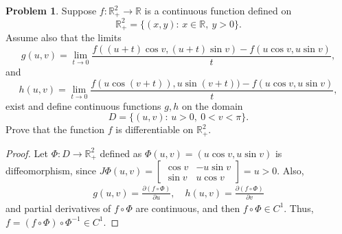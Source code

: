 \documentclass[11pt]{article}
\theoremstyle{definition}
\newtheorem{problem}{Problem}
\theoremstyle{definition}
\begin{document}
\begin{problem}
Suppose $f:\mathbb{R}^2_+\to\mathbb{R}$ is a continuous function defined on
$$\mathbb{R}^2_+=\{(x,y):\, x\in\mathbb{R},\ y>0\}.$$
Assume also that the limits
$$g(u,v)=\lim_{t\to 0}\frac{f((u+t)\cos v,(u+t)\sin v)-f(u\cos v,u\sin v)}{t},$$
and
$$h(u,v)=\lim_{t\to 0}\frac{f(u\cos (v+t)),u\sin (v+t))-f(u\cos v,u\sin v)}{t},$$
exist and define continuous functions $g,h$ on the domain
$$D=\{(u,v):\, u>0,\ 0<v<\pi\}.$$
Prove that the function $f$ is differentiable on $\mathbb{R}^2_+$.
\end{problem}
\begin{proof}
Let $\Phi: D \to \mathbb{R}^2_+$ defined as $\Phi(u,v) = (u \cos v, u \sin v)$ is diffeomorphism, since $J\Phi(u,v) = \begin{bmatrix} \cos v & -u \sin v \\ \sin v & u \cos v \end{bmatrix} = u > 0$. Also,
\begin{align*}
    g(u,v) = \frac{\partial (f \circ \Phi)}{\partial u}, \quad h(u,v) = \frac{\partial (f \circ \Phi)}{\partial v}
\end{align*}
and partial derivatives of $f \circ \Phi$ are continuous, and then $f \circ \Phi \in C^1$. Thus, $f = (f \circ \Phi) \circ \Phi^{-1} \in C^1$.
\end{proof}


\medskip
\end{document}
